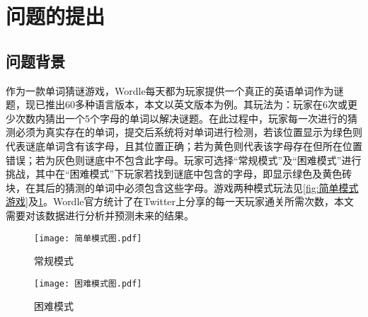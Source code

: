 \documentclass{MathModeling}
\begin{document}
\begin{abstract}
		{\heiti 针对问题四}，本文结合\textbf{散点、核密度、折线、雷达、小提琴等图}进行分析，得出更深层次结论，具体分析结果见{\heiti \textcolor{blue}{}}。

		{\heiti 针对问题五}，本文综合上述问题的分析，向《纽约时报》的谜题编辑总结结果并提出相关建议，本文提供英文及中文信函各一份，具体见{\heiti \textcolor{blue}{}}。

		最后，本文对所建立的模型进行中肯评价、提出改进措施，并对模型进行一定推广。
	\end{abstract}

	\section{问题的提出}
	\subsection{问题背景}
	作为一款单词猜谜游戏，Wordle每天都为玩家提供一个真正的英语单词作为谜题，现已推出60多种语言版本，本文以英文版本为例。其玩法为：玩家在6次或更少次数内猜出一个5个字母的单词以解决谜题。在此过程中，玩家每一次进行的猜测必须为真实存在的单词，提交后系统将对单词进行检测，若该位置显示为绿色则代表谜底单词含有该字母，且其位置正确；若为黄色则代表该字母存在但所在位置错误；若为灰色则谜底中不包含此字母。玩家可选择“常规模式”及“困难模式”进行挑战，其中在“困难模式”下玩家若找到谜底中包含的字母，即显示绿色及黄色砖块，在其后的猜测的单词中必须包含这些字母。游戏两种模式玩法见\textcolor{blue}{\cref{fig:简单模式游戏}}及\textcolor{blue}{\cref{fig:困难模式游戏}}。Wordle官方统计了在Twitter上分享的每一天玩家通关所需次数，本文需要对该数据进行分析并预测未来的结果。
	\begin{figure}[H]
		\centering
		\begin{minipage}{0.48\linewidth}
			\centering
			\texttt{[image: 简单模式图.pdf]}
			\caption{常规模式}
			\label{fig:简单模式游戏}
		\end{minipage}
		\begin{minipage}{0.48\linewidth}
			\centering
			\texttt{[image: 困难模式图.pdf]}
			\caption{困难模式}
			\label{fig:困难模式游戏}
		\end{minipage}
	\end{figure}
\end{document}
